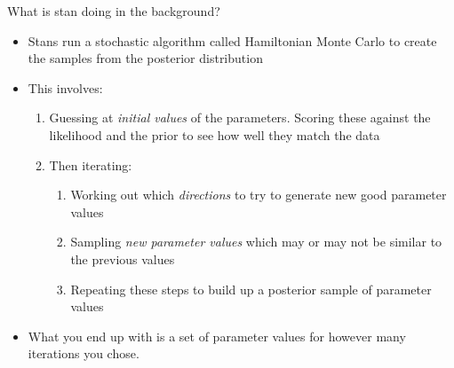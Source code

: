 \documentclass[ignorenonframetext,]{beamer}
\providecommand{\tightlist}{%
  \setlength{\itemsep}{0pt}\setlength{\parskip}{0pt}}
\begin{document}
\begin{frame}{What is stan doing in the background?}

\begin{itemize}
\item
  Stans run a stochastic algorithm called Hamiltonian Monte Carlo to
  create the samples from the posterior distribution
\item
  This involves:

  \begin{enumerate}
  \def\labelenumi{\arabic{enumi}.}
  \tightlist
  \item
    Guessing at \emph{initial values} of the parameters. Scoring these
    against the likelihood and the prior to see how well they match the
    data
  \item
    Then iterating:

    \begin{enumerate}
    \def\labelenumii{\arabic{enumii}.}
    \tightlist
    \item
      Working out which \emph{directions} to try to generate new good
      parameter values
    \item
      Sampling \emph{new parameter values} which may or may not be
      similar to the previous values
    \item
      Repeating these steps to build up a posterior sample of parameter
      values
    \end{enumerate}
  \end{enumerate}
\item
  What you end up with is a set of parameter values for however many
  iterations you chose.
\end{itemize}

\end{frame}
\end{document}
